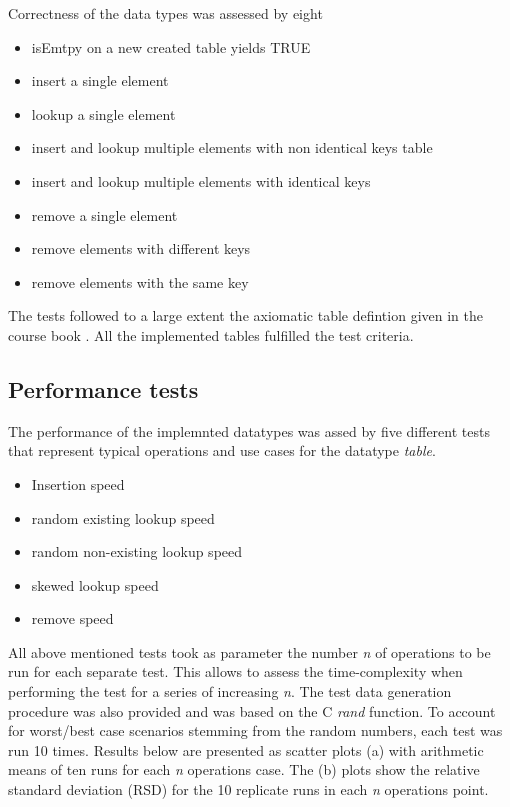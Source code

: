 \documentclass[a4paper,11pt,twoside]{article}
\begin{document}
Correctness of the data types was assessed by eight
\begin{itemize}
\item {isEmtpy} on a new created table yields TRUE
\item insert a single element
\item lookup a single element
\item insert and lookup multiple elements with non identical keys
table
\item insert and lookup multiple elements with identical keys
\item remove a single element
\item remove elements with different keys
\item remove elements with the same key
\end{itemize}

The tests followed to a large extent the axiomatic table defintion given
in the course book \cite[p 122]{janlert2000}. All the implemented
tables fulfilled the test criteria.

\subsection{Performance tests}
The performance of the implemnted datatypes was assed by five
different tests that represent typical operations and use cases for
the datatype \emph{table}. 

\begin{itemize}
\item Insertion speed
\item random existing lookup speed
\item random non-existing lookup speed 
\item skewed lookup speed
\item remove speed  
\end{itemize}

All above mentioned tests took as parameter the number \textit {n} 
of operations to be run for each separate test. This allows to assess the
time-complexity when performing the test for a series of increasing
\textit{n}. The test data generation procedure was also provided and
was based on the C \emph{rand} function. To account for worst/best case
scenarios stemming from the random numbers, each test was run 10
times. Results below are presented as scatter plots (a) with
arithmetic means of ten runs for each \textit{n} operations case. 
The (b) plots show the relative standard deviation (RSD) for the 10
replicate runs in each \textit{n} operations point.  
\end{document}
